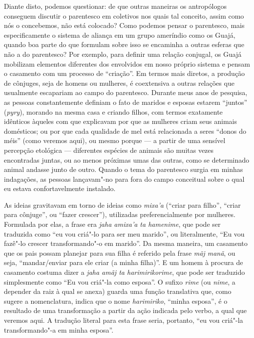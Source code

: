 Diante disto, podemos questionar: de que outras maneiras os antropólogos
conseguem discutir o parentesco em coletivos nos quais tal conceito,
assim como nós o concebemos, não está colocado? Como podemos pensar o
parentesco, mais especificamente o sistema de aliança em um grupo
ameríndio como os Guajá, quando boa parte do que formulam sobre isso se
encaminha a outras esferas que não a do parentesco? Por exemplo, para
definir uma relação conjugal, os Guajá mobilizam elementos diferentes
dos envolvidos em nosso próprio sistema e pensam o casamento com um
processo de ``criação''. Em termos mais diretos, a produção de cônjuges,
seja de homens ou mulheres, é coextensiva a outras relações que
usualmente escapariam ao campo do parentesco. Durante meus anos de
pesquisa, as pessoas constantemente definiam o fato de maridos e esposas
estarem ``juntos'' (\emph{pyry}), morando na mesma casa e criando filhos,
com termos exatamente idênticos àqueles com que explicavam por que as
mulheres criam seus animais domésticos; ou por que cada qualidade de mel
está relacionada a seres ``donos do méis'' (como veremos aqui), ou mesmo
porque --- a partir de uma sensível percepção etológica --- diferentes
espécies de animais são muitas vezes encontradas juntas, ou ao menos
próximas umas das outras, como se determinado animal andasse junto de
outro. Quando o tema do parentesco surgia em minhas indagações, as
pessoas lançavam"-no para fora do campo conceitual sobre o qual eu estava
confortavelmente instalado.

As ideias gravitavam em torno de ideias como \emph{mixa'a} (``criar para
filho'', ``criar para cônjuge'', ou ``fazer crescer''), utilizadas
preferencialmente por mulheres. Formulada por elas, a frase era
\emph{jaha amixa'a ta hamenime}, que pode ser traduzida como ``eu vou
criá"-lo para ser meu marido'', ou literalmente, ``Eu vou fazê"-lo crescer
transformando"-o em marido''. Da mesma maneira, um casamento que os pais
possam planejar para sua filha é referido pela frase \emph{mãj manã}, ou
seja, ``mandar/enviar para ele criar (a minha filha)''. E um homem à
procura de casamento costuma dizer a \emph{jaha amãj ta harimirikorime},
que pode ser traduzido simplesmente como ``Eu vou criá"-la como esposa''. O
sufixo \emph{rime} (ou \emph{nime}, a depender da raiz à qual se anexa)
guarda uma função translativa que, como sugere a nomenclatura, indica
que o nome \emph{harimiriko}, ``minha esposa'', é o resultado de uma
transformação a partir da ação indicada pelo verbo, a qual que veremos
aqui. A tradução literal para esta frase seria, portanto, ``eu vou
criá"-la transformando"-a em minha esposa''.

